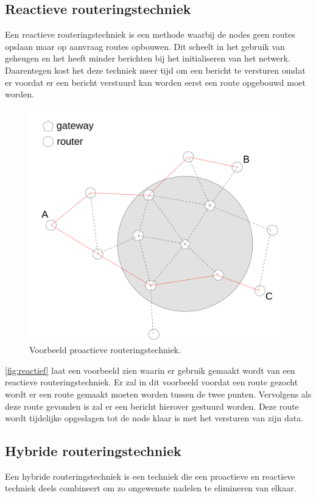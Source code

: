 \documentclass[a4paper, 11pt, oneside]{report}
\begin{document}
\subsection{Reactieve routeringstechniek}
\label{sec:meshnetwerktechniek:reactieve}

Een reactieve routeringstechniek is een methode waarbij de nodes geen routes opslaan maar op aanvraag routes opbouwen. 
Dit scheelt in het gebruik van geheugen en het heeft minder berichten bij het initialiseren van het netwerk. Daarentegen kost het deze techniek meer tijd om een bericht te versturen omdat er voordat er een bericht verstuurd kan worden eerst een route opgebouwd moet worden.

\begin{figure}[H]
	\begin{center}\includegraphics[width=0.45\linewidth]{Afbeeldingen/reactive.png}\end{center}
	\caption{Voorbeeld proactieve routeringstechniek.}
	\label{fig:reactief}
\end{figure}

\autoref{fig:reactief} laat een voorbeeld zien waarin er gebruik gemaakt wordt van een reactieve routeringstechniek.
Er zal in dit voorbeeld voordat een route gezocht wordt er een route gemaakt moeten worden tussen de twee punten.
Vervolgens als deze route gevonden is zal er een bericht hierover gestuurd worden. 
Deze route wordt tijdelijke opgeslagen tot de node klaar is met het versturen van zijn data.

\subsection{Hybride routeringstechniek}
\label{sec:meshnetwerktechniek:hybride}
Een hybride routeringstechniek is een techniek die een proactieve en reactieve techniek deels combineert om zo ongewenste nadelen te elimineren van elkaar. 
\end{document}

